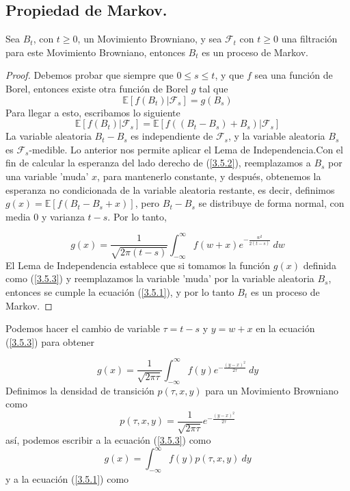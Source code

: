 \documentclass[11pt,notitlepage]{article}
\begin{document}
\subsection{Propiedad de Markov.}
\begin{teor} \label{Secc1.15_Teorema1}
Sea \(B_{t}\), con \(t \geq 0\), un Movimiento Browniano, y sea \(\mathcal{F}_{t}\) con \(t \geq 0\) una filtración para este Movimiento Browniano, entonces \(B_{t}\) es un proceso de Markov.
\end{teor}
\begin{proof}
Debemos probar que siempre que \(0 \leq s \leq t\), y que \(f\) sea una función de Borel, entonces existe otra función de Borel \(g\) tal que
\begin{equation} \label{3.5.1}
    \mathbb{E}\left[f\left(B_{t}\right)|\mathcal{F}_s\right]=g\left(B_s\right)
\end{equation}
Para llegar a esto, escribamos lo siguiente
\begin{equation}\label{3.5.2}
    \mathbb{E}\left[f\left(B_{t}\right)|\mathcal{F}_{s}\right]=\mathbb{E}\left[f\left((B_{t}-B_{s})+B_{s}\right)|\mathcal{F}_{s}\right]
\end{equation}
La variable aleatoria \(B_{t}-B_{s}\) es independiente de \(\mathcal{F}_{s}\), y la variable aleatoria \(B_{s}\) es \(\mathcal{F}_{s}\)-medible. Lo anterior nos permite aplicar el Lema de Independencia.Con el fin de calcular la esperanza del lado derecho de (\ref{3.5.2}), reemplazamos a \(B_{s}\) por una variable 'muda' \(x\), para mantenerlo constante, y después, obtenemos la esperanza no condicionada de la variable aleatoria restante, es decir, definimos \(g(x)=\mathbb{E}[f(B_{t}-B_{s}+x)]\), pero \(B_{t}-B_{s}\) se distribuye de forma normal, con media \(0\) y varianza \(t-s\). Por lo tanto,

\begin{equation} \label{3.5.3}
    g(x)=\frac{1}{\sqrt{2\pi(t-s)}} \int_{-\infty}^\infty f(w+x) e^{-\frac{w^2}{2(t-s)}} ~dw
\end{equation}
El Lema de Independencia establece que si tomamos la función \(g(x)\) definida como (\ref{3.5.3}) y reemplazamos la variable 'muda' por la variable aleatoria \(B_{s}\), entonces se cumple la ecuación (\ref{3.5.1}), y por lo tanto \(B_{t}\) es un proceso de Markov.
\end{proof}

Podemos hacer el cambio de variable \(\tau=t-s\) y \(y=w+x\) en la ecuación (\ref{3.5.3}) para obtener

\begin{equation*} 
    g(x)=\frac{1}{\sqrt{2\pi \tau}} \int_{-\infty}^\infty f(y) e^{-\frac{(y-x)^2}{2\tau}} ~dy
\end{equation*}
Definimos la densidad de transición \(p(\tau, x,y)\) para un Movimiento Browniano como
\begin{equation*}
  p(\tau, x,y)=  \frac{1}{\sqrt{2\pi \tau}} e^{-\frac{(y-x)^2}{2\tau}}
\end{equation*}
así, podemos escribir a la ecuación (\ref{3.5.3}) como
\begin{equation} \label{3.5.4}
    g(x)= \int_{-\infty}^\infty f(y) p(\tau, x,y)~dy
\end{equation}
y a la ecuación (\ref{3.5.1}) como
\end{document}
